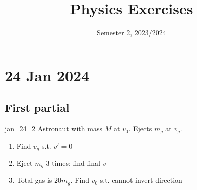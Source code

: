 \documentclass[10pt]{extarticle}
\title{Physics Exercises}
\date{Semester 2, 2023/2024}
\begin{document}
\firstpage

\section{24 Jan 2024}

\subsection{First partial}

\begin{question}{}{jan_24_2}
    Astronaut with mass $M$ at $v_0$. Ejects $m_g$ at $v_g$.
    \begin{enumerate}
        \item Find $v_g$ s.t. $v' = 0$
        \item Eject $m_g$ 3 times: find final $v$
        \item Total gas is $20m_g$. Find $v_0$ s.t. cannot invert direction
    \end{enumerate}
\end{question}
\end{document}
